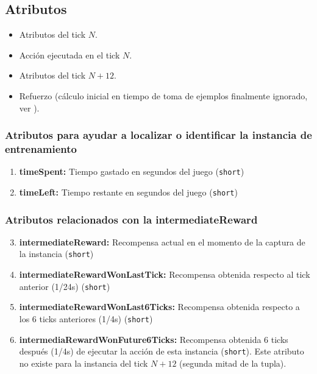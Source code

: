 \documentclass[10pt, spanish, pdftex]{../.template/template}
\newcommand*{\namerefs}[1]{\textit{\underline{\color{uc3mNewBlue}\nameref{#1}}}}
\begin{document}
    \subsection{Atributos}\label{a} %
    \begin{itemize}
        \item Atributos del tick $N$.
        \item Acción ejecutada en el tick $N$.
        \item Atributos del tick $N+12$.
        \item Refuerzo (cálculo inicial en tiempo de toma de ejemplos finalmente ignorado, ver \namerefs{refuerzo}).
    \end{itemize}
    \newpage

    \subsubsection{Atributos para ayudar a localizar o identificar la instancia de entrenamiento}
    \begin{enumerate}
        \item \textbf{timeSpent:} Tiempo gastado en segundos del juego (\texttt{short})
        \item \textbf{timeLeft:} Tiempo restante en segundos del juego (\texttt{short})
    \end{enumerate}
    \subsubsection{Atributos relacionados con la intermediateReward}
    \begin{enumerate}
        \setcounter{enumi}{2}
        \item \textbf{intermediateReward:} Recompensa actual en el momento de la captura de la instancia (\texttt{short})
        \item \textbf{intermediateRewardWonLastTick:} Recompensa obtenida respecto al tick anterior (1/24s) (\texttt{short})
        \item \textbf{intermediateRewardWonLast6Ticks:} Recompensa obtenida respecto a los 6 ticks anteriores (1/4s) (\texttt{short})
        \item \textbf{intermediaRewardWonFuture6Ticks:} Recompensa obtenida 6 ticks después (1/4s) de ejecutar la acción de esta instancia (\texttt{short}). Este atributo no existe para la instancia del tick $N+12$ (segunda mitad de la tupla).
    \end{enumerate}
\end{document}
